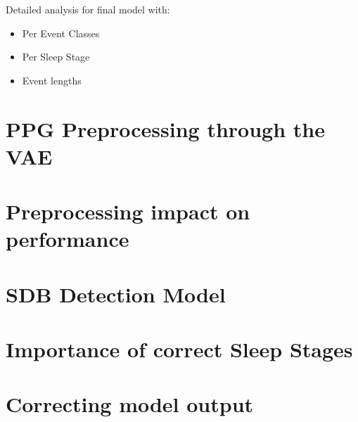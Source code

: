 Detailed analysis for final model with:
\begin{itemize}
    \item Per Event Classes
    \item Per Sleep Stage
    \item Event lengths
\end{itemize}

\section{PPG Preprocessing through the VAE}

\section{Preprocessing impact on performance}

\section{SDB Detection Model}

\section{Importance of correct Sleep Stages}

\section{Correcting model output}
